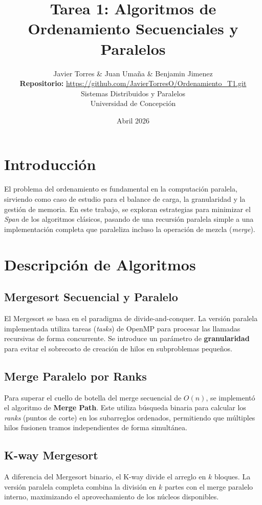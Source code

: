 \documentclass[12pt, a4paper]{article}
\title{Tarea 1: Algoritmos de Ordenamiento Secuenciales y Paralelos}
\author{Javier Torres 
\& Juan Umaña 
\& Benjamin Jimenez 
\\  \small \textbf{Repositorio:} \url{https://github.com/JavierTorresO/Ordenamiento_T1.git}
\\ \small Sistemas Distribuidos y Paralelos 
\\ \small Universidad de Concepción
}
\date{Abril 2026}
\begin{document}
\maketitle


\section{Introducción}
El problema del ordenamiento es fundamental en la computación paralela, 
sirviendo como caso de estudio para el balance de carga, la granularidad y 
la gestión de memoria. En este trabajo, se exploran estrategias para minimizar el 
\textit{Span} de los algoritmos clásicos, pasando de una recursión paralela simple a una implementación 
completa que paraleliza incluso la operación de mezcla (\textit{merge}).

\section{Descripción de Algoritmos}

\subsection{Mergesort Secuencial y Paralelo}
El Mergesort se basa en el paradigma de divide-and-conquer. 
La versión paralela implementada utiliza tareas 
(\textit{tasks}) de OpenMP para procesar las llamadas recursivas de forma concurrente. 
Se introduce un parámetro de 
\textbf{granularidad} para evitar el sobrecosto de creación de hilos en subproblemas pequeños.

\subsection{Merge Paralelo por Ranks}
Para superar el cuello de botella del merge secuencial de $O(n)$, 
se implementó el algoritmo de \textbf{Merge Path}. 
Este utiliza búsqueda binaria para calcular los 
\textit{ranks} (puntos de corte) en los subarreglos ordenados, 
permitiendo que múltiples hilos fusionen tramos independientes de forma simultánea.

\subsection{K-way Mergesort}
A diferencia del Mergesort binario, 
el K-way divide el arreglo en $k$ bloques. 
La versión paralela completa combina la división en $k$ partes con el merge paralelo interno, 
maximizando el aprovechamiento de los núcleos disponibles.
\end{document}

